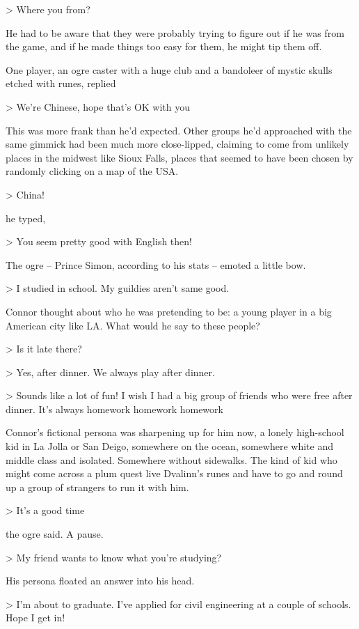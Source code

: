 \textgreater{} Where you from?

He had to be aware that they were probably trying to figure out if
he was from the game, and if he made things too easy for them, he
might tip them off.

One player, an ogre caster with a huge club and a bandoleer of
mystic skulls etched with runes, replied

\textgreater{} We're Chinese, hope that's OK with you

This was more frank than he'd expected. Other groups he'd
approached with the same gimmick had been much more close-lipped,
claiming to come from unlikely places in the midwest like Sioux
Falls, places that seemed to have been chosen by randomly clicking
on a map of the USA.

\textgreater{} China!

he typed,

\textgreater{} You seem pretty good with English then!

The ogre -- Prince Simon, according to his stats -- emoted a little
bow.

\textgreater{} I studied in school. My guildies aren't same good.

Connor thought about who he was pretending to be: a young player in
a big American city like LA. What would he say to these people?

\textgreater{} Is it late there?

\textgreater{} Yes, after dinner. We always play after dinner.

\textgreater{} Sounds like a lot of fun! I wish I had a big group
of friends who were free after dinner. It's always homework
homework homework

Connor's fictional persona was sharpening up for him now, a lonely
high-school kid in La Jolla or San Deigo, somewhere on the ocean,
somewhere white and middle class and isolated. Somewhere without
sidewalks. The kind of kid who might come across a plum quest live
Dvalinn's runes and have to go and round up a group of strangers to
run it with him.

\textgreater{} It's a good time

the ogre said. A pause.

\textgreater{} My friend wants to know what you're studying?

His persona floated an answer into his head.

\textgreater{} I'm about to graduate. I've applied for civil
engineering at a couple of schools. Hope I get in!

